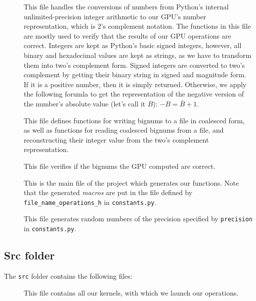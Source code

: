\documentclass[10pt, a4paper]{report}
\begin{document}
\begin{description}
\item[]
This file handles the conversions of numbers from Python's internal
unlimited-precision integer arithmetic to our GPU's number representation, which
is 2's complement notation.
The functions in this file are mostly used to verify that the results of our GPU
operations are correct.
Integers are kept as Python's basic signed integers, however, all binary and
hexadecimal values are kept as strings, as we have to transform them into two's
complement form.
Signed integers are converted to two's complement by getting their binary string
in signed and magnitude form.
If it is a positive number, then it is simply returned.
Otherwise, we apply the following forumla to get the representation of the
negative version of the number's absolute value (let's call it $B$):
$-B = \bar{B} + 1$.

\item[]
This file defines functions for writing bignums to a file in coalesced form, as
well as functions for reading coalesced bignums from a file, and reconstructing
their integer value from the two's complement representation.

\item[]
This file verifies if the bignums the GPU computed are correct.

\item[]
This is the main file of the project which generates our functions.
Note that the generated \emph{macros} are put in the file defined by
\verb+file_name_operations_h+ in \verb+constants.py+.

\item[]
This file generates random numbers of the precision specified by
\verb+precision+ in \verb+constants.py+.
\end{description}

\subsection{Src folder}
The \verb+src+ folder contains the following files:

\begin{description}
\item[]
This file contains all our kernels, with which we launch our operations.

\item[]
\item[]
\item[]
\item[]
\item[]
\end{description}
\end{document}
